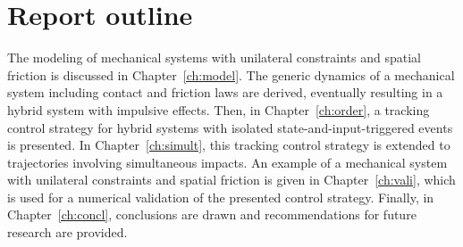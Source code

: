 \documentclass[../DC2017114Bouma.tex]{subfiles}
\begin{document}
\section{Report outline}
The modeling of mechanical systems with unilateral constraints and spatial friction is discussed in Chapter~\ref{ch:model}. The generic dynamics of a mechanical system including contact and friction laws are derived, eventually resulting in a hybrid system with impulsive effects. Then, in Chapter~\ref{ch:order}, a tracking control strategy for hybrid systems with isolated state-and-input-triggered events is presented. In Chapter~\ref{ch:simult}, this tracking control strategy is extended to trajectories involving simultaneous impacts. An example of a mechanical system with unilateral constraints and spatial friction is given in Chapter~\ref{ch:vali}, which is used for a numerical validation of the presented control strategy. Finally, in Chapter~\ref{ch:concl}, conclusions are drawn and recommendations for future research are provided.
\end{document}
